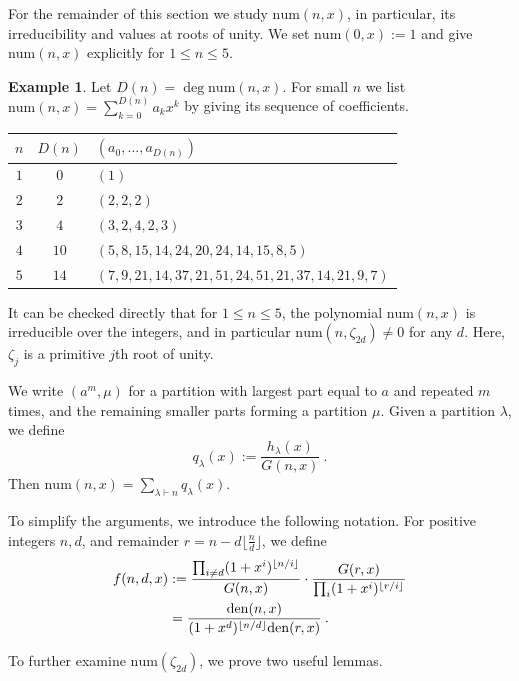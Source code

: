 \documentclass[reqno]{amsart}
\def\den{\mathrm{den}}
\def\num{\mathrm{num}}
\theoremstyle{definition}
\newtheorem{example}{Example}
\begin{document}
For the remainder of this section we study $\num(n,x)$, in particular, its irreducibility and values at roots of unity.  We set $\num(0,x):=1$ and  give $\num(n,x)$ explicitly for $1\leq n\leq 5$.  
\begin{example}\label{ex:num}
Let $D(n)=\deg\num(n,x)$.
For small $n$  we list  $\num(n,x)=\sum_{k=0}^{D(n)}a_kx^k$ by giving its sequence  of coefficients.
\begin{center}
\begin{tabular}{c|c|l}
$n$&$D(n)$&$(a_0,\ldots, a_{D(n)})$\\
\hline
$1$&$0$&$(1)$\\
$2$&$2$&$(2,2,2)$\\
$3$&$4$&$(3,2,4,2,3)$\\
$4$&$10$&$(5,8,15,14,24,20,24,14,15,8,5)$\\
$5$&$14$&$(7,9,21,14,37,21,51,24,51,21,37,14,21,9,7)$
\end{tabular}
\end{center}
It can be checked directly that for $1\leq n\leq 5$, the polynomial  $\num(n,x)$ is irreducible over the integers, and in particular $\num(n,\zeta_{2d})\neq 0$ for any  $d$. Here, $\zeta_j$ is a primitive $j$th root of unity. 
\end{example}



 We  write $(a^m, \mu)$ for a partition with largest part  equal to $a$ and repeated $m$ times, and the remaining smaller parts forming a partition $\mu$. Given a partition $\lambda$, we define  
\[
q_\lambda(x):=\frac{h_\lambda(x)}{G(n,x)}\:.
\] Then $\num(n,x)=\sum_{\lambda\vdash n}q_\lambda(x)$. 

To simplify the arguments, we introduce the following notation. For positive integers $n, d$, and remainder $r=n-d\lfloor \frac{n}{d}\rfloor$, we  define \begin{align}
       \notag f(n,d,x)&:=\frac{\prod_{i\neq d}(1+x^i)^{\lfloor n/i\rfloor}}{G(n,x)}\cdot\frac{G(r,x)}{\prod_{i}(1+x^i)^{\lfloor r/i\rfloor}}    
       \\ \label{eq:f_den} & =\frac{\den(n,x)}{(1+x^d)^{\lfloor n/d\rfloor}\den(r,x)}\:.\end{align}



To further examine $\num(\zeta_{2d})$, we prove two useful lemmas. 
\end{document}
